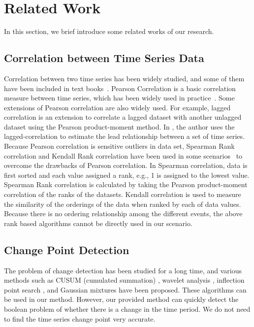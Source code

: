 \section{Related Work}
\label{sec:relatedwork}
In this section, we brief introduce some related works of our research.

\subsection{Correlation between Time Series Data}
Correlation between two time series has been widely studied, and some of them have been included in text books~\cite{johnson2002applied}. Pearson Correlation \cite{nagelkerke1991note} is a basic correlation measure between time series, which has been widely used in practice~\cite{Zhu:VLDB:2002}. Some extensions of Pearson correlation are also widely used. For example, lagged correlation is an extension to correlate a lagged dataset with another unlagged dataset using the Pearson product-moment method. In \cite{wu2010detecting}, the author uses the lagged-correlation to estimate the lead relationship between a set of time series. Because Pearson correlation is sensitive outliers in data set, Spearman Rank correlation and Kendall Rank correlation have been used in some scenarios~\cite{Lehman:SAS:2005} to overcome the drawbacks of Pearson correlation. In Spearman correlation, data is first sorted and each value assigned a rank, e.g., 1 is assigned to the lowest value. Spearman Rank correlation is calculated by taking the Pearson product-moment correlation of the ranks of the datasets. Kendall correlation is used to measure the similarity of the orderings of the data when ranked by each of data values. Because there is no ordering relationship among the different events, the above rank based algorithms cannot be directly used in our scenario.

\subsection{Change Point Detection}

The problem of change detection has been studied for a long time, and various methods such as CUSUM (cumulated summation) \cite{basseville1993detection}, wavelet analysis \cite{kadambe1992application}, inflection point search \cite{hirano2002mining}, and Gaussian mixtures \cite{yamanishi2002unifying} have been proposed. These algorithms can be used in our method. However, our provided method can quickly detect the boolean problem of whether there is a change in the time period. We do not need to find the time series change point very accurate.

